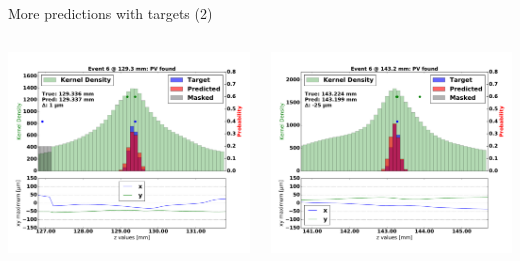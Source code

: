 \begin{frame}{More predictions with targets (2)}
  \begin{columns}[c]
        \begin{center}
           \includegraphics[width=1\textwidth, trim=60 0 60 0]{images/07Jan19_AltCNN4Layer_D35_sp_33.pdf}
        \end{center}
        \begin{center}
           \includegraphics[width=1\textwidth, trim=60 0 60 0]{images/07Jan19_AltCNN4Layer_D35_sp_34.pdf}
       \end{center}
  \end{columns}
\end{frame}



